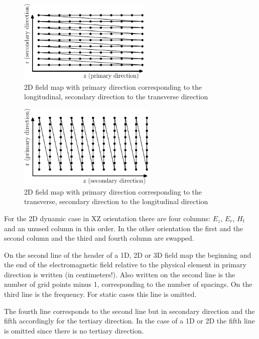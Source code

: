 \begin{figure}[ht]
  \begin{center}
    \includegraphics[origin=bl,height=40mm,angle=0]{./figures/Fieldmaps/order-1.pdf}
    \caption{2D field map with primary direction corresponding to the longitudinal, secondary direction to the transverse direction}
    \label{fig:order1}
  \end{center}
\end{figure}

\begin{figure}[ht]
  \begin{center}
    \includegraphics[origin=bl,height=40mm,angle=0]{./figures/Fieldmaps/order-2.pdf}
    \caption{2D field map with primary direction corresponding to the transverse, secondary direction to the longitudinal direction}
    \label{fig:order2}
  \end{center}
\end{figure}

For the 2D dynamic case in XZ orientation there are four columns: $E_z$, $E_r$, $H_t$ and an unused column in this order. In the other orientation the first and the second column and the third and fourth column are swapped.

On the second line of the header of a 1D, 2D or 3D field map the beginning and the end of the electromagnetic field relative to the physical element in primary direction is written (in centimeters!). Also written on the second line is the number of grid points minus 1, corresponding to the number of spacings.
On the third line is the frequency. For static cases this line is omitted.

The fourth line corresponds to the second line but in secondary direction and the fifth accordingly for the tertiary direction. In the case of a 1D or 2D the fifth line is omitted since there is no tertiary direction.


